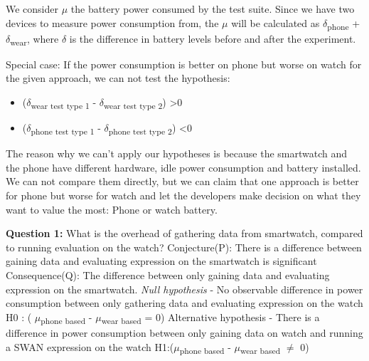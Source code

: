     We consider $\mu$ the battery power consumed by the test suite. Since we have two devices to measure power consumption from,
    the $\mu$ will be calculated as $\delta$\textsubscript{phone} +  $\delta$\textsubscript{wear}, where $\delta$ is the difference in battery levels 
    before and after the experiment.
    
    Special case:\label{special_case} If the power consumption is better on phone but worse on watch for the given approach, we can not test the hypothesis:
    \begin{itemize}
     \item ($\delta$\textsubscript{wear test type 1} -  $\delta$\textsubscript{wear test type 2}) \textgreater  0
     \item  ($\delta$\textsubscript{phone test type 1} -  $\delta$\textsubscript{phone test type 2}) \textless  0 
    \end{itemize}
    
    The reason why we can't apply our hypotheses is because the smartwatch and the phone have different hardware, idle power consumption and 
    battery installed. We can not compare them directly, but we can claim that one approach is better for phone but worse for watch and let the developers
    make decision on what they want to value the most: Phone or watch battery.

    \textbf{Question 1:} What is the overhead of gathering data from smartwatch, compared to running evaluation on the watch? \newline
Conjecture(P): There is a difference between gaining data and evaluating expression on the smartwatch is significant \newline
Consequence(Q): The difference between only gaining data and evaluating expression on the smartwatch. \newline
\textit{Null hypothesis} - No observable difference in power consumption between only gathering data and evaluating expression on the watch \newline
H0 : ( $\mu$\textsubscript{phone based} - $\mu$\textsubscript{wear based} = 0) \newline
  Alternative hypothesis - There is a difference in power consumption between only gaining data on watch and running a SWAN expression on the watch \newline
H1:($\mu$\textsubscript{phone based} - $\mu$\textsubscript{wear based} $\neq$ 0)  \newline

